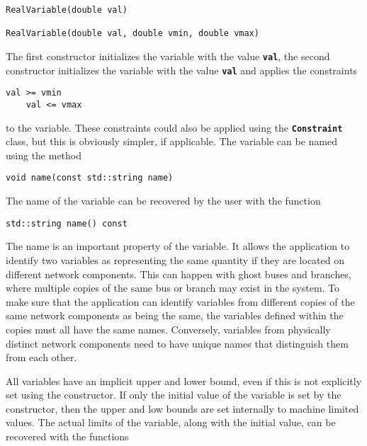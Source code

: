 {
\color{red}
\begin{Verbatim}[fontseries=b]
RealVariable(double val)

RealVariable(double val, double vmin, double vmax)
\end{Verbatim}
}

The first constructor initializes the variable with the value \texttt{\textbf{val}}, the second constructor initializes the variable with the value \texttt{\textbf{val}} and applies the constraints

{
\color{red}
\begin{Verbatim}[fontseries=b]
    val >= vmin
    val <= vmax
\end{Verbatim}
}

to the variable. These constraints could also be applied using the \texttt{\textbf{Constraint}} class, but this is obviously simpler, if applicable. The variable can be named using the method

{
\color{red}
\begin{Verbatim}[fontseries=b]
void name(const std::string name)
\end{Verbatim}
}

The name of the variable can be recovered by the user with the function

{
\color{red}
\begin{Verbatim}[fontseries=b]
std::string name() const
\end{Verbatim}
}

The name is an important property of the variable. It allows the application to identify two variables as representing the same quantity if they are located on different network components. This can happen with ghost buses and branches, where multiple copies of the same bus or branch may exist in the system. To make sure that the application can identify variables from different copies of the same network components as being the same, the variables defined within the copies must all have the same names. Conversely, variables from physically distinct network components need to have unique names that distinguish them from each other.

All variables have an implicit upper and lower bound, even if this is not explicitly set using the constructor. If only the initial value of the variable is set by the constructor, then the upper and low bounds are set internally to machine limited values. The actual limits of the variable, along with the initial value, can be recovered with the functions

